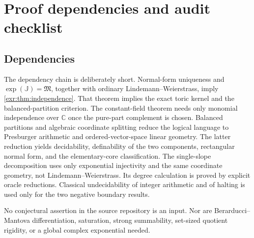 \documentclass[11pt,letterpaper]{article}
\numberwithin{equation}{section}
\theoremstyle{definition}
\theoremstyle{remark}
\newcommand{\C}{\mathbb C}
\newcommand{\J}{\mathbb J}
\newcommand{\M}{\mathfrak M}
\begin{document}
\appendix
\section{Proof dependencies and audit checklist}\label{exr:app:audit}
\subsection{Dependencies}
The dependency chain is deliberately short. Normal-form uniqueness and
$\exp(\J)=\M$, together with ordinary Lindemann--Weierstrass, imply
\cref{exr:thm:independence}. That theorem implies the exact toric kernel and the
balanced-partition criterion. The constant-field theorem needs only monomial
independence over $\C$ once the pure-part complement is chosen. Balanced partitions
and algebraic coordinate splitting reduce the logical language to Presburger
arithmetic and ordered-vector-space linear geometry. The latter reduction yields
decidability, definability of the two components, rectangular normal form, and the
elementary-core classification. The single-slope decomposition uses only
exponential injectivity and the same coordinate geometry, not
Lindemann--Weierstrass. Its degree calculation is proved by explicit oracle
reductions. Classical undecidability of integer arithmetic and of halting is
used only for the two negative boundary results.

No conjectural assertion in the source repository is an input. Nor are
Berarducci--Mantova differentiation, saturation, strong summability, set-sized
quotient rigidity, or a global complex exponential needed.
\end{document}

